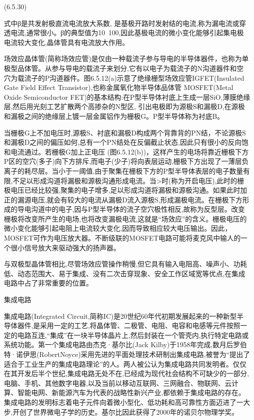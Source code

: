  	(6.5.30)

式中β是共发射极直流电流放大系数, 是基极开路时发射结的电流,称为漏电流或穿透电流,通常很小。β的典型值为10~100,因此基极电流的微小变化能够引起集电极电流较大变化,晶体管具有电流放大作用。



场效应晶体管(简称场效应管)是仅由一种载流子参与导电的半导体器件，也称为单极型品体管。从参与导电的载流子来划分,它有以电子为载流子的N沟道器件和空穴为载流子的P沟道器件。图6.5.12(a)示意了绝缘栅型场效应管IGFET(Insulated Gate Field Effect Transistor),也称金属氧化物半导体品体管 MOSFET(Metal Oxide Semiconductor FET)的基本结构:在P型半导体衬底上生成一层SiO,薄膜绝缘层,然后用光刻工艺扩散两个高掺杂的N型区, 引出电极即为源极S和漏极D,在源极和漏极之间的绝缘层上镀一层金属铝作为栅极G。P型半导体称为衬底B。



当栅极G上不加电压时,源极S、衬底和漏极D构成两个背靠背的PN结，不论源极S和漏极D之间的偏压如何,总有一个PN结处在反偏截止状态,因此只有很小的反向饱和电流通过。若栅极G加上正电压 (图6.5.12(b))，这样产生的电场将靠近栅极下方P区的空穴(多子)向下方排斥,而电子(少子)将向表层运动,栅极下方出现了一薄层负离子的耗尽层。当小于一阈值,由于聚集在栅极下方的P型半导体表层的电子数量有限,不足以形成沟道将漏极和源极沟通形成电流。当>时(称为开启电压),此时的栅极电压已经比较强,聚集的电子增多,足以形成沟道将漏极和源极沟通。如果此时加正的漏源电压,就会有较大的电流从漏极D流入源极S,形成漏极电流。在栅极下方形成的导电沟道中的电子,因与P型半导体的流子空穴极性相反,故称为反型层。改变栅极将改变所产生的电场,也将改变漏极电流,这就是“场效应”的含义。栅极电压的微小变化能够引起电阻上电流较大变化,因而导致相应较大电压输出。因此，MOSFET可作为电压放大器。不断级联的MOSFET电路可能将麦克风中输人的一个很小信号放大来驱动强大的扬声器。

与双极型晶体管相比,尽管场效应管操作稍慢,但它具有输入电阻高、噪声小、功耗低、动态范围大、易于集成、没有二次击穿现象、安全工作区域宽等优点,在集成电路中占了非常重要的位置。

集成电路

集成电路(Integrated Circuit,简称IC)是20世纪60年代初期发展起来的一种新型半导体器件,是采用一定的工艺,将晶体管、二极管、电阻、电容和电感等元件按照一定的电路互连,“集成”在一块半导体晶片上,然后封装在一个管壳内,执行特定电路或系统功能。第一个集成电路由杰克·基尔比(Jack Kilby)于1958年完成,数月后罗伯特·诺伊思(RobertNoyce)采用先进的平面处理技术研制出集成电路,被誉为“提出了适合于工业生产的集成电路理论”的人。两人被公认为集成电路共同发明者。仅仅在其开发后半个世纪,集成电路无处不在,已经成为现代社会结构不可缺少的一部分,电脑、手机、其他数字电器,以及当前以移动互联网、三网融合、物联网、云计算、智能电网、新能源汽车为代表的战略性新兴产业,都依赖于集成电路的存在。集成电路的发明标志着电子元件向着微小型化、低功耗和高可靠性方面迈进了一大步,开创了世界微电子学的历史。基尔比因此获得了2000年的诺贝尔物理学奖。

